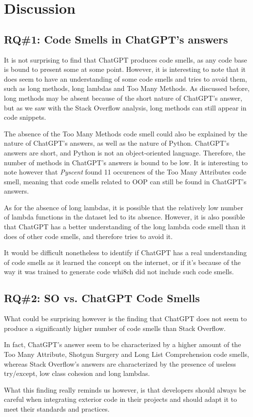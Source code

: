 \section{Discussion}
\label{sec:discussion}

\subsection{RQ\#1: Code Smells in ChatGPT's answers}
\label{sec:discussion-rq1}
It is not surprising to find that ChatGPT produces code smells, as any code base is bound to present some at some point. However, it is interesting to note that it does seem to have an understanding of some code smells and tries to avoid them, such as long methods, long lambdas and Too Many Methods. As discussed before, long methods may be absent because of the short nature of ChatGPT's answer, but as we saw with the Stack Overflow analysis, long methods can still appear in code snippets.

The absence of the Too Many Methods code smell could also be explained by the nature of ChatGPT's answers, as well as the nature of Python. ChatGPT's answers are short, and Python is not an object-oriented language. Therefore, the number of methods in ChatGPT's answers is bound to be low. It is interesting to note however that \textit{Pyscent}  found 11 occurences of the Too Many Attributes code smell, meaning that code smells related to OOP can still be found in ChatGPT's answers.

As for the absence of long lambdas, it is possible that the relatively low number of lambda functions in the dataset led to its absence. However, it is also possible that ChatGPT has a better understanding of the long lambda code smell than it does of other code smells, and therefore tries to avoid it.

It would be difficult nonetheless to identify if ChatGPT has a real understanding of code smells as it learned the concept on the internet, or if it's because of the way it was trained to generate code whi8ch did not include such code smells. \\

\subsection{RQ\#2: SO vs. ChatGPT Code Smells}
\label{sec:discussion-rq2}
What could be surprising however is the finding that ChatGPT does not seem to produce a significantly higher number of code smells than Stack Overflow.

In fact, ChatGPT's answer seem to be characterized by a higher amount of the Too Many Attribute, Shotgun Surgery and Long List Comprehension code smells, whereas Stack Overflow's answers are characterized by the presence of useless try/except, low class cohesion and long lambdas.

What this finding really reminds us however, is that developers should always be careful when integrating exterior code in their projects and should adapt it to meet their standards and practices. \\